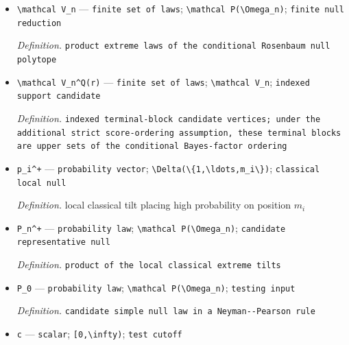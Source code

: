 \documentclass{article}
\begin{document}
\begin{itemize}
  \par\smallskip\noindent\emph{Definition.} \texttt{global product law generated by local extreme tilts}
  \item \texttt{\textbackslash{}\allowbreak{}mathcal V\_\allowbreak{}n} --- \texttt{finite set of laws}; \texttt{\textbackslash{}\allowbreak{}mathcal P(\textbackslash{}\allowbreak{}Omega\_\allowbreak{}n)}; \texttt{finite null reduction}
  \par\smallskip\noindent\emph{Definition.} \texttt{product extreme laws of the conditional Rosenbaum null polytope}
  \item \texttt{\textbackslash{}\allowbreak{}mathcal V\_\allowbreak{}n\textasciicircum{}Q(r)} --- \texttt{finite set of laws}; \texttt{\textbackslash{}\allowbreak{}mathcal V\_\allowbreak{}n}; \texttt{indexed support candidate}
  \par\smallskip\noindent\emph{Definition.} \texttt{indexed terminal-\allowbreak{}block candidate vertices;\allowbreak{} under the additional strict score-\allowbreak{}ordering assumption,\allowbreak{} these terminal blocks are upper sets of the conditional Bayes-\allowbreak{}factor ordering}
  \item \texttt{p\_\allowbreak{}i\textasciicircum{}+\allowbreak{}} --- \texttt{probability vector}; \texttt{\textbackslash{}\allowbreak{}Delta(\textbackslash{}\allowbreak{}\{1,\allowbreak{}\textbackslash{}\allowbreak{}ldots,\allowbreak{}m\_\allowbreak{}i\textbackslash{}\allowbreak{}\}\allowbreak{})}; \texttt{classical local null}
  \par\smallskip\noindent\emph{Definition.} local classical tilt placing high probability on position \(m_i\)
  \item \texttt{P\_\allowbreak{}n\textasciicircum{}+\allowbreak{}} --- \texttt{probability law}; \texttt{\textbackslash{}\allowbreak{}mathcal P(\textbackslash{}\allowbreak{}Omega\_\allowbreak{}n)}; \texttt{candidate representative null}
  \par\smallskip\noindent\emph{Definition.} \texttt{product of the local classical extreme tilts}
  \item \texttt{P\_\allowbreak{}0} --- \texttt{probability law}; \texttt{\textbackslash{}\allowbreak{}mathcal P(\textbackslash{}\allowbreak{}Omega\_\allowbreak{}n)}; \texttt{testing input}
  \par\smallskip\noindent\emph{Definition.} \texttt{candidate simple null law in a Neyman-\allowbreak{}-\allowbreak{}Pearson rule}
  \item \texttt{c} --- \texttt{scalar}; \texttt{[0,\allowbreak{}\textbackslash{}\allowbreak{}infty)}; \texttt{test cutoff}

\end{itemize}
\end{document}
